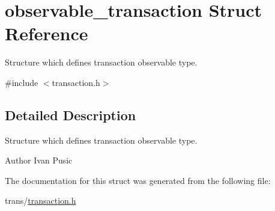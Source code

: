 \hypertarget{structobservable__transaction}{\section{observable\+\_\+transaction Struct Reference}
\label{structobservable__transaction}
}


Structure which defines transaction observable type.  




{\ttfamily \#include $<$transaction.\+h$>$}



\subsection{Detailed Description}
Structure which defines transaction observable type. 

\begin{DoxyAuthor}{Author}
Ivan Pusic 
\end{DoxyAuthor}


The documentation for this struct was generated from the following file\+:\begin{DoxyCompactItemize}
\item 
trans/\hyperlink{transaction_8h}{transaction.\+h}\end{DoxyCompactItemize}
